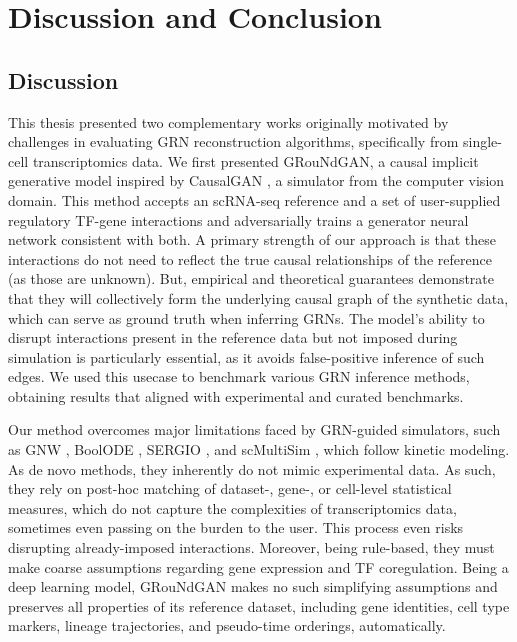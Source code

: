 \chapter{Discussion and Conclusion}
\section*{Discussion}

This thesis presented two complementary works originally motivated by challenges in evaluating GRN reconstruction algorithms, specifically from single-cell transcriptomics data. We first presented GRouNdGAN, a causal implicit generative model inspired by CausalGAN \cite{kocaoglu2017causalgan}, a simulator from the computer vision domain. This method accepts an scRNA-seq reference and a set of user-supplied regulatory TF-gene interactions and adversarially trains a generator neural network consistent with both. A primary strength of our approach is that these interactions do not need to reflect the true causal relationships of the reference (as those are unknown). But, empirical and theoretical guarantees demonstrate that they will collectively form the underlying causal graph of the synthetic data, which can serve as ground truth when inferring GRNs. The model’s ability to disrupt interactions present in the reference data but not imposed during simulation is particularly essential, as it avoids false-positive inference of such edges. We used this usecase to benchmark various GRN inference methods, obtaining results that aligned with experimental and curated benchmarks. 


Our method overcomes major limitations faced by GRN-guided simulators, such as GNW \cite{schaffter2011genenetweaver}, BoolODE \cite{pratapa2020benchmarking}, SERGIO \cite{dibaeinia2020sergio}, and scMultiSim \cite{li2025scmultisim}, which follow kinetic modeling. As de novo methods, they inherently do not mimic experimental data. As such, they rely on post-hoc matching of dataset-, gene-, or cell-level statistical measures, which do not capture the complexities of transcriptomics data, sometimes even passing on the burden to the user. This process even risks disrupting already-imposed interactions. Moreover, being rule-based, they must make coarse assumptions regarding gene expression and TF coregulation. Being a deep learning model, GRouNdGAN makes no such simplifying assumptions and preserves all properties of its reference dataset, including gene identities, cell type markers, lineage trajectories, and pseudo-time orderings, automatically.

